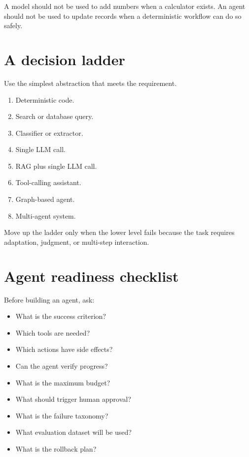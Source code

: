A model should not be used to add numbers when a calculator exists. An agent should not be used to update records when a deterministic workflow can do so safely.

\section{A decision ladder}

Use the simplest abstraction that meets the requirement.

\begin{enumerate}[leftmargin=*]
  \item Deterministic code.
  \item Search or database query.
  \item Classifier or extractor.
  \item Single LLM call.
  \item RAG plus single LLM call.
  \item Tool-calling assistant.
  \item Graph-based agent.
  \item Multi-agent system.
\end{enumerate}

Move up the ladder only when the lower level fails because the task requires adaptation, judgment, or multi-step interaction.

\section{Agent readiness checklist}

Before building an agent, ask:

\begin{itemize}[leftmargin=*]
  \item What is the success criterion?
  \item Which tools are needed?
  \item Which actions have side effects?
  \item Can the agent verify progress?
  \item What is the maximum budget?
  \item What should trigger human approval?
  \item What is the failure taxonomy?
  \item What evaluation dataset will be used?
  \item What is the rollback plan?
\end{itemize}


